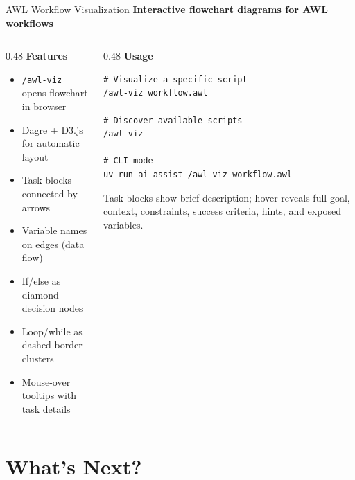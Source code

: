\documentclass[aspectratio=169,10pt]{beamer}
\begin{document}
\begin{frame}[fragile]{AWL Workflow Visualization}
\textbf{Interactive flowchart diagrams for AWL workflows}

\medskip
\begin{columns}[T]
\begin{column}{0.48\textwidth}
\textbf{Features}
\begin{itemize}\scriptsize\setlength{\itemsep}{1pt}
  \item \texttt{/awl-viz} opens flowchart in browser
  \item Dagre + D3.js for automatic layout
  \item Task blocks connected by arrows
  \item \alert{Variable names} on edges (data flow)
  \item If/else as diamond decision nodes
  \item Loop/while as dashed-border clusters
  \item Mouse-over tooltips with task details
\end{itemize}
\end{column}
\begin{column}{0.48\textwidth}
\textbf{Usage}
\begin{lstlisting}[style=code,language={}]
# Visualize a specific script
/awl-viz workflow.awl

# Discover available scripts
/awl-viz

# CLI mode
uv run ai-assist /awl-viz workflow.awl
\end{lstlisting}

\medskip
{\scriptsize\color{gray}
Task blocks show brief description; hover reveals full goal, context, constraints, success criteria, hints, and exposed variables.}
\end{column}
\end{columns}
\end{frame}

\section{What's Next?}
\end{document}

